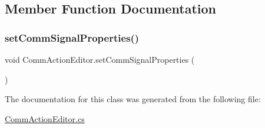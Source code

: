 \subsection{Member Function Documentation}
\mbox{\label{class_comm_action_editor_a2b01d693e77eb550d6366289bfc7a765}} 
\subsubsection{\texorpdfstring{set\+Comm\+Signal\+Properties()}{setCommSignalProperties()}}
{\footnotesize\ttfamily void Comm\+Action\+Editor.\+set\+Comm\+Signal\+Properties (\begin{DoxyParamCaption}{ }\end{DoxyParamCaption})}



The documentation for this class was generated from the following file\+:\begin{DoxyCompactItemize}
\item 
\mbox{\hyperlink{_comm_action_editor_8cs}{Comm\+Action\+Editor.\+cs}}\end{DoxyCompactItemize}
